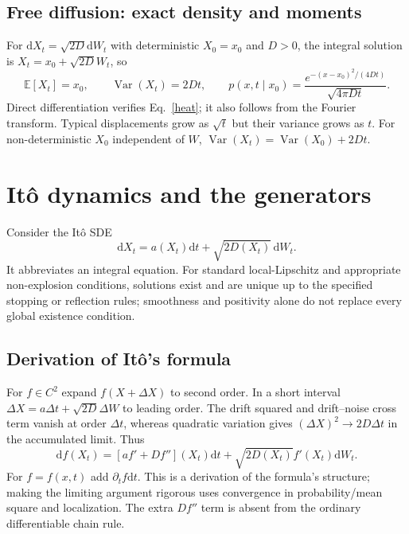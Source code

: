 \documentclass[11pt,a4paper]{article}
\newcommand{\dd}{\mathrm d}
\newcommand{\E}{\mathbb E}
\theoremstyle{remark}\newtheorem*{remark}{Physical interpretation}
\begin{document}
\subsection{Free diffusion: exact density and moments}
For $\dd X_t=\sqrt{2D}\dd W_t$ with deterministic $X_0=x_0$ and $D>0$, the integral solution is $X_t=x_0+\sqrt{2D}W_t$, so
\begin{equation}\E[X_t]=x_0,\qquad \operatorname{Var}(X_t)=2Dt,\qquad
p(x,t\mid x_0)=\frac{e^{-(x-x_0)^2/(4Dt)}}{\sqrt{4\pi Dt}}.\end{equation}
Direct differentiation verifies Eq.~\eqref{heat}; it also follows from the Fourier transform. Typical displacements grow as $\sqrt t$ but their variance grows as $t$. For non-deterministic $X_0$ independent of $W$, $\operatorname{Var}(X_t)=\operatorname{Var}(X_0)+2Dt$.

\section{It\^o dynamics and the generators}
Consider the It\^o SDE
\begin{equation}\label{sde}\dd X_t=a(X_t)\dd t+\sqrt{2D(X_t)}\,\dd W_t.\end{equation}
It abbreviates an integral equation. For standard local-Lipschitz and appropriate non-explosion conditions, solutions exist and are unique up to the specified stopping or reflection rules; smoothness and positivity alone do not replace every global existence condition.

\subsection{Derivation of It\^o's formula}
For $f\in C^2$ expand $f(X+\Delta X)$ to second order. In a short interval $\Delta X=a\Delta t+\sqrt{2D}\Delta W$ to leading order. The drift squared and drift--noise cross term vanish at order $\Delta t$, whereas quadratic variation gives $(\Delta X)^2\to2D\Delta t$ in the accumulated limit. Thus
\begin{equation}\label{ito}\dd f(X_t)=[a f'+Df''](X_t)\dd t+\sqrt{2D(X_t)}f'(X_t)\dd W_t.\end{equation}
For $f=f(x,t)$ add $\partial_t f\dd t$. This is a derivation of the formula's structure; making the limiting argument rigorous uses convergence in probability/mean square and localization. The extra $Df''$ term is absent from the ordinary differentiable chain rule.
\end{document}

